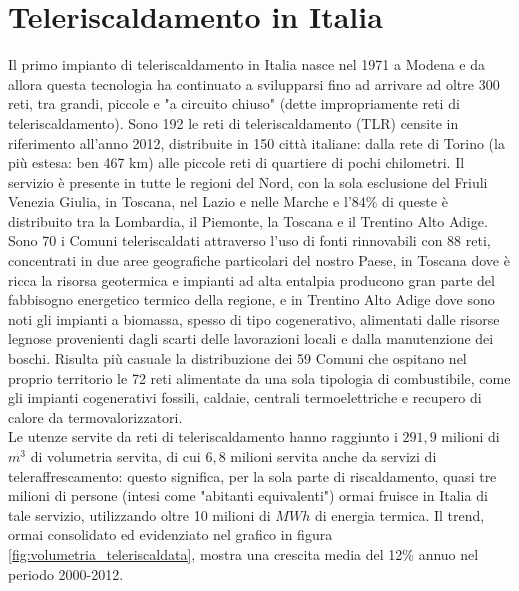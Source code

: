\documentclass[laurea,oneside,11pt]{USiena_tesiLM}
\begin{document}
\section{Teleriscaldamento in Italia}
Il primo impianto di teleriscaldamento in Italia nasce nel 1971 a Modena e da allora questa tecnologia ha continuato a svilupparsi fino ad arrivare ad oltre 300 reti, tra grandi, piccole e "a circuito chiuso" (dette impropriamente reti di teleriscaldamento). Sono 192 le reti di teleriscaldamento (TLR) censite in riferimento all'anno 2012, distribuite in 150 città italiane: dalla rete di Torino (la più estesa: ben 467 km) alle piccole reti di quartiere di pochi chilometri.
Il servizio è presente in tutte le regioni del Nord, con la sola esclusione del Friuli Venezia Giulia, in Toscana, nel Lazio e nelle Marche e l'$84\%$ di queste è distribuito tra la Lombardia, il Piemonte, la Toscana e il Trentino Alto Adige.\\

Sono 70 i Comuni teleriscaldati attraverso l'uso di fonti rinnovabili con 88 reti, concentrati in due aree geografiche particolari del nostro Paese, in Toscana dove è ricca la risorsa geotermica e impianti ad alta entalpia producono gran parte del fabbisogno energetico termico della regione, e in Trentino Alto Adige dove sono noti gli impianti a biomassa, spesso di tipo cogenerativo, alimentati dalle risorse legnose provenienti dagli scarti delle lavorazioni locali e dalla manutenzione dei boschi.
Risulta più casuale  la distribuzione dei 59 Comuni che ospitano nel proprio territorio le 72 reti alimentate da una sola tipologia di combustibile, come gli impianti cogenerativi fossili, caldaie, centrali termoelettriche e recupero di calore da termovalorizzatori. \\

Le utenze servite da reti di teleriscaldamento hanno raggiunto i $291,9$ milioni di $m^3$ di volumetria servita, di cui $6,8$ milioni servita anche da servizi di teleraffrescamento: questo significa, per la sola parte di riscaldamento, quasi tre milioni di persone (intesi come "abitanti equivalenti") ormai fruisce in Italia di tale servizio, utilizzando oltre 10 milioni di $MWh$ di energia termica.
Il trend, ormai consolidato ed evidenziato nel grafico in figura \ref{fig:volumetria_teleriscaldata}, mostra una crescita media del 12\% annuo nel periodo 2000-2012. 
\end{document}
